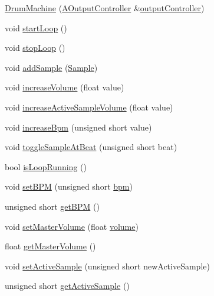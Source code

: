 \begin{DoxyCompactItemize}
\item 
\hyperlink{class_drum_machine_acacd501a2615a2f0215c04873860ce98}{Drum\+Machine} (\hyperlink{class_a_output_controller}{A\+Output\+Controller} \&\hyperlink{class_drum_machine_a4a5b4d6cc6e4a3ce2c2893e52fd0e951}{output\+Controller})
\item 
void \hyperlink{class_drum_machine_ac42508031bbf331d41c8004ed663c1c1}{start\+Loop} ()
\item 
void \hyperlink{class_drum_machine_af1564a42f1c2717534a61437617070b3}{stop\+Loop} ()
\item 
void \hyperlink{class_drum_machine_a530ac2c3529492c62a01619786fb3765}{add\+Sample} (\hyperlink{class_sample}{Sample})
\item 
void \hyperlink{class_drum_machine_ab823055aa6c1fa1dd91b1e45f3e66f0f}{increase\+Volume} (float value)
\item 
void \hyperlink{class_drum_machine_a2316557d08fecdaa8936be2562749e95}{increase\+Active\+Sample\+Volume} (float value)
\item 
void \hyperlink{class_drum_machine_adbaa7d80f7aa34f1ca190e163515e3e6}{increase\+Bpm} (unsigned short value)
\item 
void \hyperlink{class_drum_machine_ac34e64779cd419a75628630f71a3041b}{toggle\+Sample\+At\+Beat} (unsigned short beat)
\item 
bool \hyperlink{class_drum_machine_aaa0c2e00a5009b239aac709c37602c7d}{is\+Loop\+Running} ()
\item 
void \hyperlink{class_drum_machine_aac554a614388d11543698f407b0e11e6}{set\+B\+PM} (unsigned short \hyperlink{class_drum_machine_afaa80be4a66f759ab590a5f67f327b67}{bpm})
\item 
unsigned short \hyperlink{class_drum_machine_a9a7a34dca1803071fec5b6687cb98343}{get\+B\+PM} ()
\item 
void \hyperlink{class_drum_machine_a19af9f5fbe3242cee5685f1ede574a26}{set\+Master\+Volume} (float \hyperlink{class_drum_machine_af1401c2a8e1d016ec32c662968e581fd}{volume})
\item 
float \hyperlink{class_drum_machine_a3590f99d021aad35cca24fdcb0f8a246}{get\+Master\+Volume} ()
\item 
void \hyperlink{class_drum_machine_a1b6ff2afd815b9981e8a008c857c1847}{set\+Active\+Sample} (unsigned short new\+Active\+Sample)
\item 
unsigned short \hyperlink{class_drum_machine_ac8ef152a82bbce61bc1e2715c3e476b9}{get\+Active\+Sample} ()
\end{DoxyCompactItemize}
